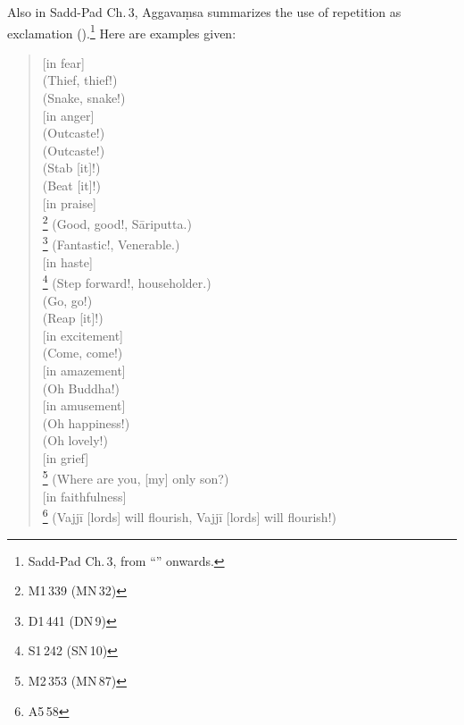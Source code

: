 Also in Sadd-Pad Ch.\,3, Aggava\d msa summarizes the use of repetition as exclamation ().\footnote{Sadd-Pad Ch.\,3, from ``'' onwards.} Here are examples given:

\begin{quote}
[in fear]\\
 (Thief, thief!)\\
 (Snake, snake!)\\[1.5mm]
[in anger]\\
 (Outcaste!)\\
 (Outcaste!)\\
 (Stab [it]!)\\
 (Beat [it]!)\\[1.5mm]
[in praise]\\
\footnote{M1\,339 (MN\,32)} (Good, good!, S\=ariputta.)\\
\footnote{D1\,441 (DN\,9)} (Fantastic!, Venerable.)\\[1.5mm]
[in haste]\\
\footnote{S1\,242 (SN\,10)} (Step forward!, householder.)\\
 (Go, go!)\\
 (Reap [it]!)\\[1.5mm]
[in excitement]\\
 (Come, come!)\\[1.5mm]
[in amazement]\\
 (Oh Buddha!)\\[1.5mm]
[in amusement]\\
 (Oh happiness!)\\
 (Oh lovely!)\\[1.5mm]
[in grief]\\
\footnote{M2\,353 (MN\,87)} (Where are you, [my] only son?)\\[1.5mm]
[in faithfulness]\\
\footnote{A5\,58} (Vajj\=i [lords] will flourish, Vajj\=i [lords] will flourish!)\\[1.5mm]
\end{quote}

